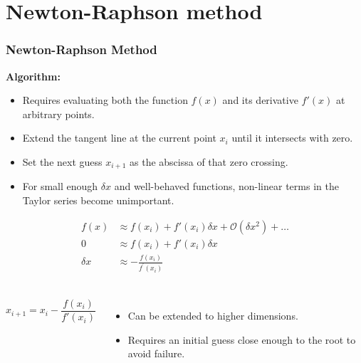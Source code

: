\section{Newton-Raphson method}
\begin{frame}[fragile]
    \frametitle{Newton-Raphson Method}

    \textbf{Algorithm:}
    \begin{itemize}
        \item Requires evaluating both the function \( f(x) \) and its derivative \( f'(x) \) at arbitrary points.
        \item Extend the tangent line at the current point \( x_i \) until it intersects with zero.
        \item Set the next guess \( x_{i+1} \) as the abscissa of that zero crossing.
        \item For small enough \( \delta x \) and well-behaved functions, non-linear terms in the Taylor series become unimportant.
    \end{itemize}
    \vspace{-0.10cm}
    \begin{align*}
    f(x) &\approx f(x_i) + f'(x_i)\delta x + \mathcal{O}(\delta x^2) + \dots \\
    0 &\approx f(x_i) + f'(x_i)\delta x \\
    \delta x &\approx -\frac{f(x_i)}{f^\prime (x_i)} \\
    \end{align*}

    \vspace{-1.2cm}
    \begin{columns}
    \[
      \boxed{x_{i+1} = x_i - \frac{f(x_i)}{f'(x_i)}}
      \]   
    \begin{itemize}
        \item Can be extended to higher dimensions.
        \item Requires an initial guess close enough to the root to avoid failure.
    \end{itemize}
  \end{columns}
    
\end{frame}

